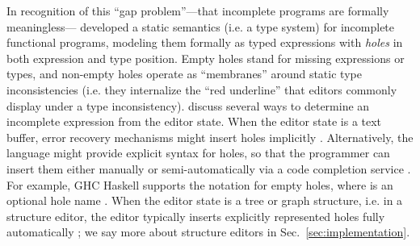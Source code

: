 
In recognition of this ``{gap problem}''---that incomplete programs are formally meaningless---\citet{popl-paper} developed a static semantics (i.e. a type system) for incomplete 
functional programs, modeling them formally as typed expressions with \emph{holes} in 
both expression and type position. 
Empty holes stand for missing expressions or types,
and non-empty holes operate as ``membranes'' around static type inconsistencies 
(i.e. they internalize the ``red underline'' that editors commonly display under a type inconsistency).
\citet{HazelnutSNAPL} discuss several ways to determine an incomplete expression from the editor state. When the editor state is a text buffer, error recovery mechanisms might insert holes implicitly \cite{DBLP:journals/siamcomp/AhoP72,charles1991practical,graham1979practical,DBLP:conf/oopsla/KatsJNV09}. Alternatively, the language might provide explicit syntax for holes, so that the programmer can insert them either manually  
or semi-automatically via a code completion service \cite{Amorim2016}. For example, GHC Haskell supports the notation  for empty holes, where  is an optional hole name \cite{GHCHoles}. When the editor state is a tree or graph structure, i.e. in a structure editor, the editor typically inserts explicitly represented holes fully automatically \cite{popl-paper}; we say more about structure editors in Sec.~\ref{sec:implementation}.

